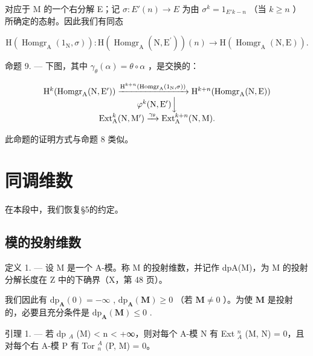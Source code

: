 对应于 M 的一个右分解 E；记 \(\sigma : E'(n) \to E\) 为由 \(\sigma^k = 1_{E'k - n}\) （当 \(k \geqslant n\) ）所确定的态射。因此我们有同态

\[
\mathrm{H} \left(\operatorname{Homgr} _ {\mathrm{A}} \left(1 _ {\mathrm{N}}, \sigma\right)\right): \mathrm{H} \left(\operatorname{Homgr} _ {\mathrm{A}} \left(\mathrm{N}, \mathrm{E} ^ {\prime}\right)\right) (n) \rightarrow \mathrm{H} \left(\operatorname{Homgr} _ {\mathrm{A}} (\mathrm{N}, \mathrm{E})\right).
\]

命题 9. --- 下图，其中 \(\gamma_{\theta}(\alpha) = \theta \circ \alpha\) ，是交换的：

\[
\begin{array}{c} \mathrm{H} ^ {k} (\text {Homgr} _ {\mathrm{A}} (\mathrm{N}, \mathrm{E} ^ {\prime})) \xrightarrow {\mathrm{H} ^ {k + n} (\text {Homgr} _ {\mathrm{A}} (1 _ {\mathrm{N}} , \sigma))} \mathrm{H} ^ {k + n} (\text {Homgr} _ {\mathrm{A}} (\mathrm{N}, \mathrm{E})) \\ \varphi^ {k} (\mathrm{N}, \mathrm{E} ^ {\prime}) \Big \downarrow \\ \operatorname{Ext} _ {\mathrm{A}} ^ {k} (\mathrm{N}, \mathrm{M} ^ {\prime}) \xrightarrow {\gamma_ {\theta}} \operatorname{Ext} _ {\mathrm{A}} ^ {k + n} (\mathrm{N}, \mathrm{M}). \end{array}
\]

此命题的证明方式与命题 8 类似。

\section{同调维数}

在本段中，我们恢复§5的约定。

\subsection{模的投射维数}

定义 1. --- 设 M 是一个 A-模。称 M 的投射维数，并记作 dpA(M)，为 M 的投射分解长度在 Z 中的下确界（X，第 48 页）。

我们因此有 \(\mathrm{dp}_{\mathbf{A}}(0) = -\infty\) , \(\mathrm{dp}_{\mathbf{A}}(\mathbf{M}) \geqslant 0\) （若 \(\mathbf{M} \neq 0\) ）。为使 \(\mathbf{M}\) 是投射的，必要且充分条件是 \(\mathrm{dp}_{\mathbf{A}}(\mathbf{M}) \leqslant 0\) .

引理 1. --- 若 dp \(_{A}\) (M) \textless{} n \textless{} +∞，则对每个 A-模 N 有 Ext \(_{A}^{n}\) (M, N) = 0，且对每个右 A-模 P 有 Tor \(_{n}^{A}\) (P, M) = 0。

